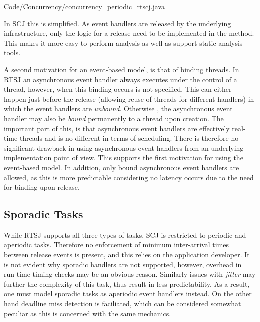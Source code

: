 
{Code/Concurrency/concurrency_periodic_rtscj.java}

In SCJ this is simplified. As event handlers are released by the underlying infrastructure, only the logic for a release need to be implemented in the  method. This makes it more easy to perform analysis as well as support static analysis tools.

A second motivation for an event-based model, is that of binding threads. In RTSJ an asynchronous event handler always executes under the control of a thread, however, when this binding occurs is not specified. This can either happen just before the release (allowing reuse of threads for different handlers) in which the event handlers are \textit{unbound}. Otherwise , the asynchronous event handler may also be \textit{bound} permanently to a thread upon creation. The important part of this, is that asynchronous event handlers are effectively real-time threads and is no different in terms of scheduling. There is therefore no significant drawback in using asynchronous event handlers from an underlying implementation point of view. This supports the first motivation for using the event-based model. In addition, only bound asynchronous event handlers are allowed, as this is more predictable considering no latency occurs due to the need for binding upon release.

\subsection{Sporadic Tasks} %
\label{sub:support_for_sporadic_tasks}
While RTSJ supports all three types of tasks, SCJ is restricted to periodic and aperiodic tasks. Therefore no enforcement of minimum inter-arrival times between release events is present, and this relies on the application developer. It is not evident why sporadic handlers are not supported, however, overhead in run-time timing checks may be an obvious reason. Similarly issues with \textit{jitter} may further the complexity of this task, thus result in less predictability. As a result, one must model sporadic tasks as aperiodic event handlers instead. On the other hand deadline miss detection is faciliated, which can be considered somewhat peculiar as this is concerned with the same mechanics.

